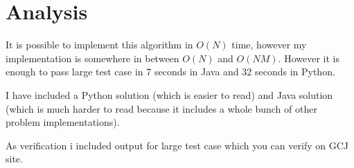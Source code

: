 \documentclass[11pt]{article}
\begin{document}
\section{Analysis}

It is possible to implement this algorithm in $O(N)$ time, however my implementation is somewhere in between $O(N)$ and $O(NM)$.  However it is enough to pass large test case in 7 seconds in Java and 32 seconds in Python.

I have included a Python solution (which is easier to read) and Java solution (which is much harder to read because it includes a whole bunch of other problem implementations).

As verification i included output for large test case which you can verify on GCJ site.



\end{document}
